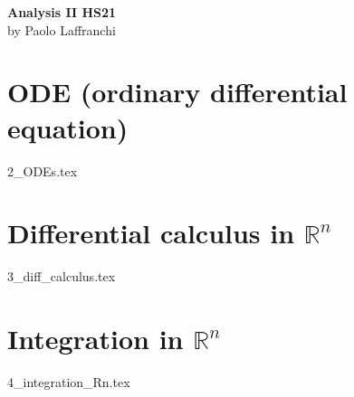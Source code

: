 \documentclass[10pt,landscape, a4paper]{article}
\newcommand{\R}{\mathbb{R}}
\newcommand{\Rn}{\R^n}
\begin{document}
\begin{multicols*}{3}
    \begin{center}
        \Large{\textbf{Analysis II HS21}} \\
        \small{by Paolo Laffranchi}
    \end{center}
    \section{ODE (ordinary differential equation)}
    {2_ODEs.tex}
    
    
    \section{Differential calculus in $\mathbb{R}^n$}
    {3_diff_calculus.tex}


    
    \section{Integration in $\Rn$}
    {4_integration_Rn.tex}

\end{multicols*}
\end{document}
